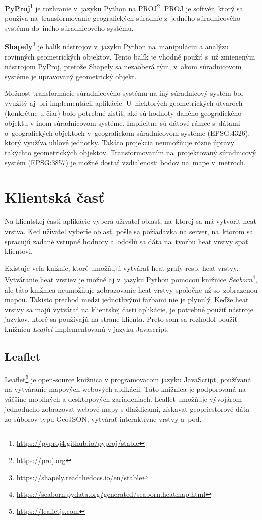 \textbf{PyProj}\footnote{\url{https://pyproj4.github.io/pyproj/stable}} je rozhranie v~jazyku Python na PROJ\footnote{\url{https://proj.org}}. PROJ je softvér, ktorý sa používa na~transformovanie geografických súradníc z~jedného súradnicového systému do~iného súradnicového systému.

\textbf{Shapely}\footnote{\url{https://shapely.readthedocs.io/en/stable}} je balík nástrojov v~jazyku Python na~manipuláciu a analýzu rovinných geometrických objektov. Tento balík je vhodné použiť s~už zmieneným nástrojom PyProj, pretože Shapely sa nezaoberá tým, v~akom súradnicovom systéme je upravovaný geometrický objekt. 

Možnosť transformácie súradnicového systému na iný súradnicový systém bol využitý aj~pri implementácii aplikácie. U~niektorých geometrických útvaroch (konkrétne u čiar) bolo potrebné zistiť, aké sú hodnoty daného geografického objektu v inom súradnicovom systéme. Implicitne sú dátové rámce s~dátami o~geografických objektoch v~geografickom súradnicovom systéme (EPSG:4326), ktorý využíva uhlové jednotky. Takáto projekcia neumožňuje rôzne úpravy takýchto geometrických objektov. Transformovaním na~projektovaný súradnicový systém (EPSG:3857) je možné dostať vzdialenosti bodov na~mape v~metroch.


\section{Klientská časť}
Na klientskej časti aplikácie vyberá užívateľ oblasť, na~ktorej sa má vytvoriť heat vrstva. Keď užívateľ vyberie oblasť, pošle sa požiadavka na server, na~ktorom sa spracujú zadané vstupné hodnoty a~odošlú sa dáta na~tvorbu heat vrstvy späť klientovi.

Existuje veľa knižníc, ktoré umožňujú vytvárať heat grafy resp. heat vrstvy. Vytváranie heat vrstiev je možné aj v~jazyku Python pomocou knižnice \emph{Seaborn}\footnote{\url{https://seaborn.pydata.org/generated/seaborn.heatmap.html}}, ale táto knižnica neumožňuje zobrazovanie heat vrstvy spoločne už so~zobrazenou mapou. Takisto prechod medzi jednotlivými farbami nie je plynulý. Keďže heat vrstvy sa majú vytvárať na klientskej časti aplikácie, je potrebné použiť nástroje jazykov, ktoré sa používajú na strane klienta. Preto som sa rozhodol použiť knižnicu \emph{Leaflet} implementovanú v jazyku Javascript.

\subsection{Leaflet}
Leaflet\footnote{\url{https://leafletjs.com}} je open-source knižnica v programovacom jazyku JavaScript, používaná na vytváranie mapových webových aplikácii. Táto knižnica je podporovaná na väčšine mobilných a desktopových zariadeniach. Leaflet umožňuje vývojárom jednoducho zobrazovať webové mapy s dlaždicami, získavať geopriestorové dáta zo súborov typu GeoJSON, vytvárať interaktívne vrstvy a~pod.

